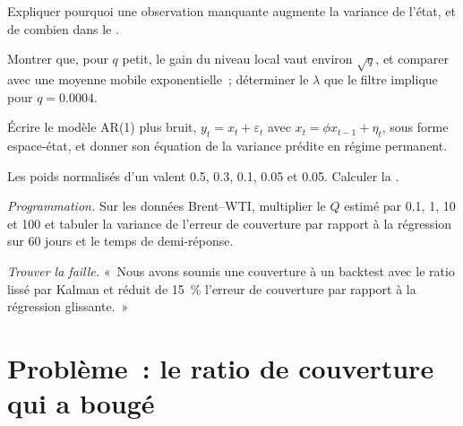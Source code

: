 \begin{exercise}[$\star$]\label{exo:qm:state-space-models-and-the-kalman-filter:3}
Expliquer pourquoi une observation manquante augmente la variance de l'état, et de combien dans le .
\end{exercise}

\begin{exercise}[$\star\star$]\label{exo:qm:state-space-models-and-the-kalman-filter:4}
Montrer que, pour $q$ petit, le gain du niveau local vaut environ $\sqrt q$, et comparer avec une moyenne mobile exponentielle~;
déterminer le $\lambda$ que le filtre implique pour $q = 0.0004$.
\end{exercise}

\begin{exercise}[$\star\star$]\label{exo:qm:state-space-models-and-the-kalman-filter:5}
Écrire le modèle AR(1) plus bruit, $y_t = x_t + \varepsilon_t$ avec $x_t = \phi x_{t-1} + \eta_t$, sous forme espace-état, et donner son équation
de la variance prédite en régime permanent.
\end{exercise}

\begin{exercise}[$\star\star$]\label{exo:qm:state-space-models-and-the-kalman-filter:6}
Les poids normalisés d'un  valent 0.5, 0.3, 0.1, 0.05 et 0.05. Calculer la .
\end{exercise}

\begin{exercise}[$\star\star\star$]\label{exo:qm:state-space-models-and-the-kalman-filter:7}
\emph{Programmation.} Sur les données Brent--WTI, multiplier le $Q$ estimé par 0.1, 1, 10 et 100 et tabuler la variance de l'erreur de couverture par rapport à la régression sur 60 jours et
le temps de demi-réponse.
\end{exercise}

\begin{exercise}[$\star\star\star$]\label{exo:qm:state-space-models-and-the-kalman-filter:8}
\emph{Trouver la faille.} «~Nous avons soumis une couverture à un backtest avec le ratio lissé par Kalman et réduit de 15~\% l'erreur de couverture par rapport à la régression glissante.~»
\end{exercise}

\section{Problème~: le ratio de couverture qui a bougé}

